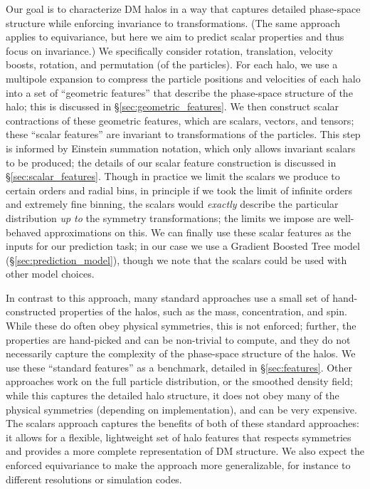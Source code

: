 Our goal is to characterize DM halos in a way that captures detailed phase-space structure while enforcing invariance to transformations.
(The same approach applies to equivariance, but here we aim to predict scalar properties and thus focus on invariance.)
We specifically consider rotation, translation, velocity boosts, rotation, and permutation (of the particles).
For each \dark halo, we use a multipole expansion to compress the particle positions and velocities of each halo into a set of ``geometric features'' that describe the phase-space structure of the halo; this is discussed in \S\ref{sec:geometric_features}.
We then construct scalar contractions of these geometric features, which are scalars, vectors, and tensors; these ``scalar features'' are invariant to transformations of the particles. 
This step is informed by Einstein summation notation, which only allows invariant scalars to be produced; the details of our scalar feature construction is discussed in \S\ref{sec:scalar_features}.
Though in practice we limit the scalars we produce to certain orders and radial bins, in principle if we took the limit of infinite orders and extremely fine binning, the scalars would \emph{exactly} describe the particular distribution \emph{up to} the symmetry transformations; the limits we impose are well-behaved approximations on this.
We can finally use these scalar features as the inputs for our prediction task; in our case we use a Gradient Boosted Tree model (\S\ref{sec:prediction_model}), though we note that the scalars could be used with other model choices.

In contrast to this approach, many standard approaches use a small set of hand-constructed properties of the halos, such as the mass, concentration, and spin.
While these do often obey physical symmetries, this is not enforced; further, the properties are hand-picked and can be non-trivial to compute, and they do not necessarily capture the complexity of the phase-space structure of the halos.
We use these ``standard features'' as a benchmark, detailed in \S\ref{sec:features}.
Other approaches work on the full particle distribution, or the smoothed density field; while this captures the detailed halo structure, it does not obey many of the physical symmetries (depending on implementation), and can be very expensive.
The scalars approach captures the benefits of both of these standard approaches: it allows for a flexible, lightweight set of halo features that respects symmetries and provides a more complete representation of DM structure.
We also expect the enforced equivariance to make the approach more generalizable, for instance to different resolutions or simulation codes.


